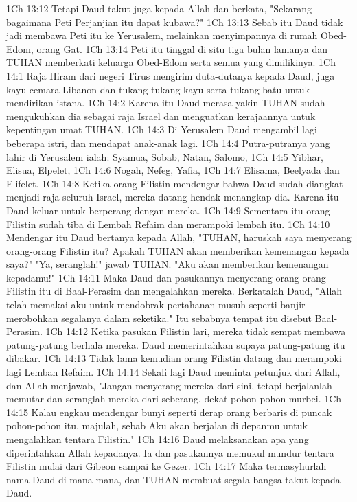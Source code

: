 1Ch 13:12  Tetapi Daud takut juga kepada Allah dan berkata, "Sekarang bagaimana Peti Perjanjian itu dapat kubawa?"
1Ch 13:13  Sebab itu Daud tidak jadi membawa Peti itu ke Yerusalem, melainkan menyimpannya di rumah Obed-Edom, orang Gat.
1Ch 13:14  Peti itu tinggal di situ tiga bulan lamanya dan TUHAN memberkati keluarga Obed-Edom serta semua yang dimilikinya.
1Ch 14:1  Raja Hiram dari negeri Tirus mengirim duta-dutanya kepada Daud, juga kayu cemara Libanon dan tukang-tukang kayu serta tukang batu untuk mendirikan istana.
1Ch 14:2  Karena itu Daud merasa yakin TUHAN sudah mengukuhkan dia sebagai raja Israel dan menguatkan kerajaannya untuk kepentingan umat TUHAN.
1Ch 14:3  Di Yerusalem Daud mengambil lagi beberapa istri, dan mendapat anak-anak lagi.
1Ch 14:4  Putra-putranya yang lahir di Yerusalem ialah: Syamua, Sobab, Natan, Salomo,
1Ch 14:5  Yibhar, Elisua, Elpelet,
1Ch 14:6  Nogah, Nefeg, Yafia,
1Ch 14:7  Elisama, Beelyada dan Elifelet.
1Ch 14:8  Ketika orang Filistin mendengar bahwa Daud sudah diangkat menjadi raja seluruh Israel, mereka datang hendak menangkap dia. Karena itu Daud keluar untuk berperang dengan mereka.
1Ch 14:9  Sementara itu orang Filistin sudah tiba di Lembah Refaim dan merampoki lembah itu.
1Ch 14:10  Mendengar itu Daud bertanya kepada Allah, "TUHAN, haruskah saya menyerang orang-orang Filistin itu? Apakah TUHAN akan memberikan kemenangan kepada saya?" "Ya, seranglah!" jawab TUHAN. "Aku akan memberikan kemenangan kepadamu!"
1Ch 14:11  Maka Daud dan pasukannya menyerang orang-orang Filistin itu di Baal-Perasim dan mengalahkan mereka. Berkatalah Daud, "Allah telah memakai aku untuk mendobrak pertahanan musuh seperti banjir merobohkan segalanya dalam seketika." Itu sebabnya tempat itu disebut Baal-Perasim.
1Ch 14:12  Ketika pasukan Filistin lari, mereka tidak sempat membawa patung-patung berhala mereka. Daud memerintahkan supaya patung-patung itu dibakar.
1Ch 14:13  Tidak lama kemudian orang Filistin datang dan merampoki lagi Lembah Refaim.
1Ch 14:14  Sekali lagi Daud meminta petunjuk dari Allah, dan Allah menjawab, "Jangan menyerang mereka dari sini, tetapi berjalanlah memutar dan seranglah mereka dari seberang, dekat pohon-pohon murbei.
1Ch 14:15  Kalau engkau mendengar bunyi seperti derap orang berbaris di puncak pohon-pohon itu, majulah, sebab Aku akan berjalan di depanmu untuk mengalahkan tentara Filistin."
1Ch 14:16  Daud melaksanakan apa yang diperintahkan Allah kepadanya. Ia dan pasukannya memukul mundur tentara Filistin mulai dari Gibeon sampai ke Gezer.
1Ch 14:17  Maka termasyhurlah nama Daud di mana-mana, dan TUHAN membuat segala bangsa takut kepada Daud.
